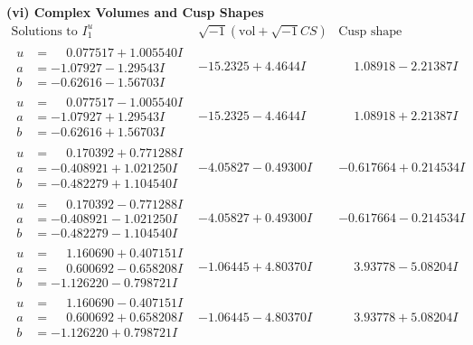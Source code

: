 \documentclass[1p]{elsarticle_modified}
\theoremstyle{definition}
\newcommand{\I}{\sqrt{-1}}
\begin{document}
\newpage\flushleft \textbf{(vi) Complex Volumes and Cusp Shapes}
$$\begin{array}{c|c|c}  
\text{Solutions to }I^u_{1}& \I (\text{vol} + \sqrt{-1}CS) & \text{Cusp shape}\\
 \hline 
\begin{aligned}
u &= \phantom{-}0.077517 + 1.005540 I \\
a &= -1.07927 - 1.29543 I \\
b &= -0.62616 - 1.56703 I\end{aligned}
 & -15.2325 + 4.4644 I & \phantom{-}1.08918 - 2.21387 I \\ \hline\begin{aligned}
u &= \phantom{-}0.077517 - 1.005540 I \\
a &= -1.07927 + 1.29543 I \\
b &= -0.62616 + 1.56703 I\end{aligned}
 & -15.2325 - 4.4644 I & \phantom{-}1.08918 + 2.21387 I \\ \hline\begin{aligned}
u &= \phantom{-}0.170392 + 0.771288 I \\
a &= -0.408921 + 1.021250 I \\
b &= -0.482279 + 1.104540 I\end{aligned}
 & -4.05827 - 0.49300 I & -0.617664 + 0.214534 I \\ \hline\begin{aligned}
u &= \phantom{-}0.170392 - 0.771288 I \\
a &= -0.408921 - 1.021250 I \\
b &= -0.482279 - 1.104540 I\end{aligned}
 & -4.05827 + 0.49300 I & -0.617664 - 0.214534 I \\ \hline\begin{aligned}
u &= \phantom{-}1.160690 + 0.407151 I \\
a &= \phantom{-}0.600692 - 0.658208 I \\
b &= -1.126220 - 0.798721 I\end{aligned}
 & -1.06445 + 4.80370 I & \phantom{-}3.93778 - 5.08204 I \\ \hline\begin{aligned}
u &= \phantom{-}1.160690 - 0.407151 I \\
a &= \phantom{-}0.600692 + 0.658208 I \\
b &= -1.126220 + 0.798721 I\end{aligned}
 & -1.06445 - 4.80370 I & \phantom{-}3.93778 + 5.08204 I \\ \hline\begin{aligned}

\end{aligned}
\end{array}$$
\end{document}
